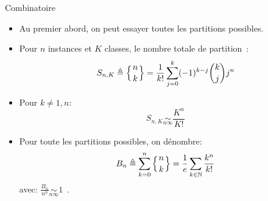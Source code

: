 \documentclass[8pt]{beamer}
\begin{document}
			\begin{frame}{Combinatoire}
				\begin{itemize}
					\item<1-> Au premier abord, on peut essayer toutes les partitions possibles.
					\item<2-> Pour \(n\) instances et \(K\) classes, le nombre totale de partition~\cite{StirlingWiki}:
						\begin{equation}
							S_{n,K} \triangleq \left\{ {n \atop k}\right\} = \frac{1}{k!}\sum_{j=0}^{k} (-1)^{k-j} \binom{k}{j} j^n
						\end{equation}
					\item<3-> Pour \(k \neq 1, n\):
						\begin{equation}
							S_{n,K} \underset{n\infty}{\sim} \frac{K^n}{K!}
						\end{equation}
					\item<4-> Pour toute les partitions possibles, on dénombre:
						\begin{equation}
							B_n \triangleq \sum_{k=0}^n \left\{ {n \atop k}\right\} = \frac{1}{e}\sum_{k\in\mathbb{N}} \frac{k^n}{k!}
						\end{equation}
						avec: \(\frac{B_n}{n^n} \underset{n\infty}{\sim} 1\)~\cite{BellWiki}.
				\end{itemize}
			\end{frame}
\end{document}
